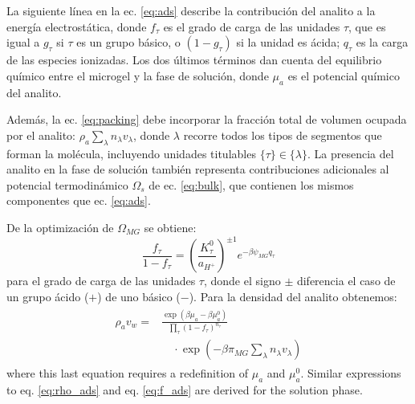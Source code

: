 La siguiente l\'inea en la ec. \ref{eq:ads} describe la contribuci\'on del analito a la energ\'ia electrost\'atica, donde $f_\tau$ es el grado de carga de las unidades $\tau$, que es igual a $g_\tau$ si $\tau$ es un grupo b\'asico, o $(1-g_\tau)$ si la unidad es \'acida; $q_\tau$ es la carga de las especies ionizadas.
Los dos \'ultimos t\'erminos dan cuenta del equilibrio qu\'imico entre el microgel y la fase de soluci\'on, donde $\mu_a$ es el potencial qu\'imico del analito.

Adem\'as, la ec. \ref{eq:packing} debe incorporar la fracci\'on total de volumen ocupada por el analito: $\rho_a \sum_\lambda n_\lambda v_\lambda$, donde $\lambda$ recorre todos los tipos de segmentos que forman la mol\'ecula, incluyendo unidades titulables $\{\tau\}\in\{\lambda\}$.
La presencia del analito en la fase de soluci\'on tambi\'en representa contribuciones adicionales al potencial termodin\'amico $\Omega_s$ de ec. \ref{eq:bulk}, que contienen los mismos componentes que ec. \ref{eq:ads}.

De la optimizaci\'on de  $\Omega_{MG}$  se obtiene:
%
\begin{equation}
\frac{f_\tau}{1-f_\tau}=\left(\frac{K^0_\tau}{a_{H^+}}\right)^{\pm 1} e^{-\beta \psi_{MG} q_\tau}
\label{eq:f_ads}
\end{equation}
%
\noindent para el grado de carga de las unidades $\tau$, donde el signo $\pm$ diferencia el caso de un grupo \'acido ($+$) de uno b\'asico ($-$).
Para la densidad del analito obtenemos:
%
\begin{align}
    \begin{aligned}
   \rho_a v_w =&\frac{ \exp{\left(\beta \mu_a - \beta \mu^0_a \right)}}{\prod_\tau \left(1-f_\tau\right)^{n_\tau}}\\
&\quad \cdot\exp{\left(-\beta \pi_{MG} \sum_\lambda n_\lambda v_\lambda \right)} 
    \end{aligned}\label{eq:rho_ads}
\end{align}
%
\noindent where this last equation requires a redefinition of $\mu_a$ and $\mu_a^0$.
Similar expressions to eq. \ref{eq:rho_ads} and eq. \ref{eq:f_ads} are derived for the solution phase.







